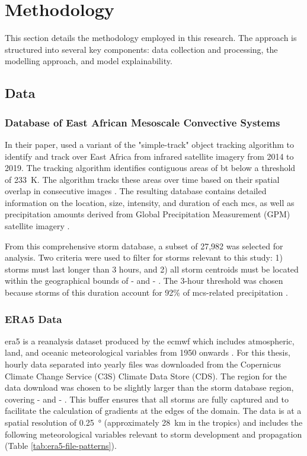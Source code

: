 \chapter{Methodology}
\label{ch:method}

This section details the methodology employed in this research. The approach is structured into several key components: data collection and processing, the modelling approach, and model explainability.

\section{Data}

\subsection{Database of East African Mesoscale Convective Systems}

In their paper, \cite{Hill2023} used a variant of the "simple-track" object tracking algorithm to identify and track  over East Africa from infrared satellite imagery from 2014 to 2019. The tracking algorithm identifies contiguous areas of \acrfull{bt} below a threshold of \SI{233}{\kelvin}. The algorithm tracks these areas over time based on their spatial overlap in consecutive images \citep{Stein2020}. The resulting database contains detailed information on the location, size, intensity, and duration of each \acrshort{mcs}, as well as precipitation amounts derived from Global Precipitation Measurement (GPM) satellite imagery \citep{Huffman2015}.

From this comprehensive storm database, a subset of 27,982  was selected for analysis. Two criteria were used to filter for storms relevant to this study: 1) storms must last longer than 3 hours, and 2) all storm centroids must be located within the geographical bounds of  -  and  - . The 3-hour threshold was chosen because storms of this duration account for 92\% of \acrshort{mcs}-related precipitation \citep{Hill2023}.

\subsection{ERA5 Data}
\label{sec:era5-data}

\acrshort{era5} is a reanalysis dataset produced by the \acrfull{ecmwf} which includes atmospheric, land, and oceanic meteorological variables from 1950 onwards \citep{Hersbach2020}. For this thesis, hourly data separated into yearly files was downloaded from the Copernicus Climate Change Service (C3S) Climate Data Store (CDS). The region for the data download was chosen to be slightly larger than the storm database region, covering  -  and  - . This buffer ensures that all storms are fully captured and to facilitate the calculation of gradients at the edges of the domain. The data is at a spatial resolution of \SI{0.25}{\degree} (approximately \SI{28}{\km} in the tropics) and includes the following meteorological variables relevant to storm development and propagation (Table \ref{tab:era5-file-patterns}).

